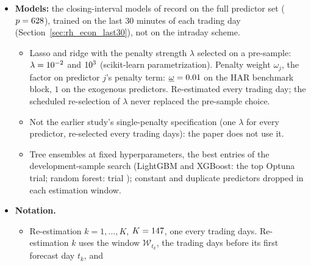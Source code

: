 \begin{itemize}
\item \textbf{Models:} the closing-interval models of record on the full predictor set ($p = 628$), trained on
  the last 30 minutes of each trading day (Section~\ref{sec:rh_econ_last30}), not on the intraday scheme.
  \begin{itemize}
  \item Lasso and ridge with the penalty strength $\lambda$ selected on a pre-sample: $\lambda = 10^{-2}$ and
    $10^{3}$ (scikit-learn parametrization). Penalty weight $\omega_j$, the factor on predictor $j$'s penalty
    term: $\underline{\omega} = 0.01$ on the HAR benchmark block, $1$ on the exogenous predictors.
    Re-estimated every trading day; the scheduled re-selection of $\lambda$ never replaced the pre-sample choice.
  \item Not the earlier study's single-penalty specification (one $\lambda$ for every predictor, re-selected every
    \rhfiOldBlock{} trading days): the paper does not use it.
  \item Tree ensembles at fixed hyperparameters, the best entries of the development-sample search (LightGBM and
    XGBoost: the top Optuna trial; random forest: trial \rhdmRfTrial); constant and duplicate predictors dropped in
    each estimation window.
  \end{itemize}
\item \textbf{Notation.}
  \begin{itemize}
  \item Re-estimation $k = 1, \dots, K$, $K = 147$, one every \rhfiRefitEvery{} trading days. Re-estimation
    $k$ uses the window $\mathcal W_{t_k}$, the \rhfiWindow{} trading days before its first forecast day $t_k$, and

\end{itemize}
\end{itemize}
